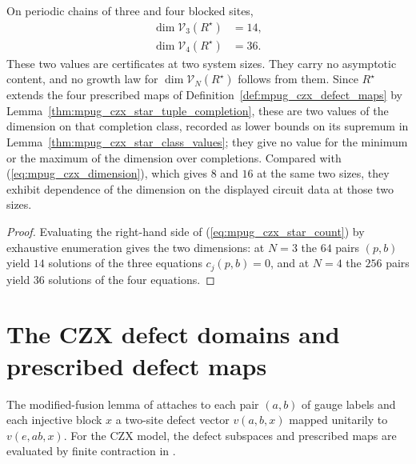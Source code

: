 \begin{lemma}
    \label{thm:mpug_czx_star_dimension}
    \leanok
    On periodic chains of three and four blocked sites,
    \begin{align}
        \dim\mathcal V_3(R^\star) & =14,
        \label{eq:mpug_czx_star_dim_three} \\
        \dim\mathcal V_4(R^\star) & =36.
        \label{eq:mpug_czx_star_dim_four}
    \end{align}
    These two values are certificates at two system sizes. They carry no
    asymptotic content, and no growth law for $\dim\mathcal V_N(R^\star)$
    follows from them. Since $R^\star$ extends the four prescribed maps of
    Definition~\ref{def:mpug_czx_defect_maps} by
    Lemma~\ref{thm:mpug_czx_star_tuple_completion}, these are two values of
    the dimension on that completion class, recorded as lower bounds on its
    supremum in Lemma~\ref{thm:mpug_czx_star_class_values}; they give no
    value for the minimum or the maximum of the dimension over completions.
    Compared with
    (\ref{eq:mpug_czx_dimension}), which gives $8$ and $16$ at the same two
    sizes, they exhibit dependence of the dimension on the displayed circuit
    data at those two sizes.
\end{lemma}

\begin{proof}\leanok
    Evaluating the right-hand side of (\ref{eq:mpug_czx_star_count}) by
    exhaustive enumeration gives the two dimensions: at $N=3$ the $64$
    pairs $(p,b)$ yield $14$ solutions of the three equations
    $c_j(p,b)=0$, and at $N=4$ the $256$ pairs yield $36$ solutions of
    the four equations.
\end{proof}

\section{The CZX defect domains and prescribed defect maps}
\label{sec:mpug_czx_defect_maps}

The modified-fusion lemma of
\cite[lines~4215--4254]{FrancoRubio2025MPUGauging} attaches to each pair
$(a,b)$ of gauge labels and each injective block $x$ a two-site defect vector
$v(a,b,x)$ mapped unitarily to $v(e,ab,x)$. For the CZX model, the defect
subspaces and prescribed maps are evaluated by finite contraction in
\cite{gap:fbc25_czx_defect_domains}.

